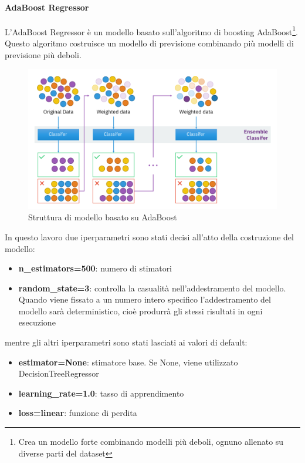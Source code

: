 \paragraph{AdaBoost Regressor}
L'AdaBoost Regressor è un modello basato sull'algoritmo di boosting AdaBoost\footnote{Crea un modello forte combinando modelli più deboli, ognuno allenato su diverse parti del dataset}{}. Questo algoritmo costruisce un modello di previsione combinando più modelli di previsione più deboli.
\begin{figure}[H]
    \centering
    \includegraphics[scale=0.4]{images/AdaBoost.png}
    \caption{Struttura di modello basato su AdaBoost}
\end{figure}

\noindent In questo lavoro due iperparametri sono stati decisi all'atto della costruzione del modello:

\begin{itemize}
    \item \textbf{n\_estimators=500}: numero di stimatori
    \item \textbf{random\_state=3}:  controlla la casualità nell'addestramento del modello. Quando viene fissato a un numero intero specifico l'addestramento del modello sarà deterministico, cioè produrrà gli stessi risultati in ogni esecuzione
\end{itemize}

\noindent mentre gli altri iperparametri sono stati lasciati ai valori di default:
\begin{itemize}
    \item \textbf{estimator=None}: stimatore base. Se None, viene utilizzato DecisionTreeRegressor
    \item \textbf{learning\_rate=1.0}: tasso di apprendimento
    \item \textbf{loss=linear}: funzione di perdita
\end{itemize}
